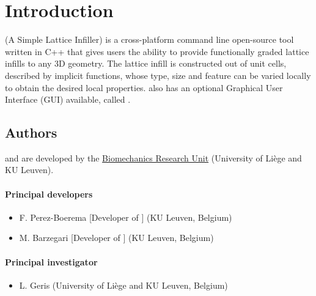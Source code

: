 \section{Introduction} \label{sec:intro}
\asli{} (A Simple Lattice Infiller) is a cross-platform command line open-source tool written in C++ that gives users the ability to provide functionally graded lattice infills to any 3D geometry. The lattice infill is constructed out of unit cells, described by implicit functions, whose type, size and feature can be varied locally to obtain the desired local properties. \asli{} also has an optional Graphical User Interface (GUI) available, called \qasli{}.


\subsection{Authors} \label{sec:authors}
\asli{} and \qasli{} are developed by the \href{http://www.biomech.ulg.ac.be}{Biomechanics Research Unit} (University of Li\`{e}ge and KU Leuven). %

\paragraph*{Principal developers}
\begin{itemize}
	\item F. Perez-Boerema [Developer of \asli{}] (KU Leuven, Belgium)
	\item M. Barzegari [Developer of \qasli{}] (KU Leuven, Belgium)
\end{itemize}

\paragraph*{Principal investigator}
\begin{itemize}
	\item L. Geris (University of Li\`{e}ge and KU Leuven, Belgium)
\end{itemize}


